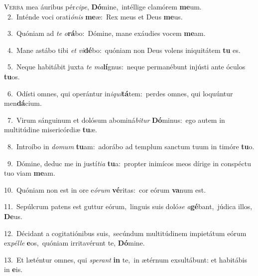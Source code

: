 \lettrine{\initial\textcolor{\initialcolor}{V}}{erba} mea áuribus pér\-\textit{ci}\-\textit{pe}, \textbf{Dó}\-mine,~\star intéllige clamórem \textbf{me}\-um.\\
{\numbfont\textcolor{\numbcolor}{~2.}}~Inténde voci orati\-\textit{ó}\-\textit{nis} \textbf{me}\-æ:~\star Rex meus et Deus \textbf{me}\-us.\par
{\numbfont\textcolor{\numbcolor}{~3.}}~Quóniam ad \textit{te} \textit{o}\-\textbf{rá}bo:~\star Dómine, mane exáudies vocem \textbf{me}\-am.\par
{\numbfont\textcolor{\numbcolor}{~4.}}~Mane astábo tibi \textit{et} \textit{vi}\-\textbf{dé}bo:~\star quóniam non Deus volens iniquitátem \textbf{tu} es.\par
{\numbfont\textcolor{\numbcolor}{~5.}}~Neque habitábit juxta \textit{te} \textit{ma}\-\textbf{lí}gnus:~\star neque permanébunt injústi ante óculos \textbf{tu}\-os.\par
{\numbfont\textcolor{\numbcolor}{~6.}}~Odísti omnes, qui operántur in\-\textit{i}\-\textit{qui}\textbf{tá}tem:~\star perdes omnes, qui loquúntur men\-\textbf{dá}\-cium.\par
{\numbfont\textcolor{\numbcolor}{~7.}}~Virum sánguinum et dolósum abominá\-\textit{bi}\-\textit{tur} \textbf{Dó}\-minus:~\star ego autem in multitúdine misericórdiæ \textbf{tu}\-æ.\par
{\numbfont\textcolor{\numbcolor}{~8.}}~Introíbo in \textit{do}\-\textit{mum} \textbf{tu}\-am:~\star adorábo ad templum sanctum tuum in timóre \textbf{tu}\-o.\par
{\numbfont\textcolor{\numbcolor}{~9.}}~Dómine, deduc me in justí\-\textit{ti}\-\textit{a} \textbf{tu}\-a:~\star propter inimícos meos dírige in conspéctu tuo viam \textbf{me}\-am.\par
{\numbfont\textcolor{\numbcolor}{10.}}~Quóniam non est in ore e\-\textit{ó}\-\textit{rum} \textbf{vé}\-ritas:~\star cor eórum \textbf{va}\-num est.\par
{\numbfont\textcolor{\numbcolor}{11.}}~Sepúlcrum patens est guttur eórum,~\dagger linguis suis doló\textit{se} \textit{a}\-\textbf{gé}bant,~\star júdica illos, \textbf{De}\-us.\par
{\numbfont\textcolor{\numbcolor}{12.}}~Décidant a cogitatiónibus suis,~\dagger secúndum multitúdinem impietátum eórum ex\-\textit{pél}\-\textit{le} \textbf{e}\-os,~\star quóniam irritavérunt te, \textbf{Dó}\-mine.\par
{\numbfont\textcolor{\numbcolor}{13.}}~Et læténtur omnes, qui \textit{spe}\-\textit{rant} \textbf{in} te,~\star in ætérnum exsultábunt: et habitábis in \textbf{e}\-is.\par
